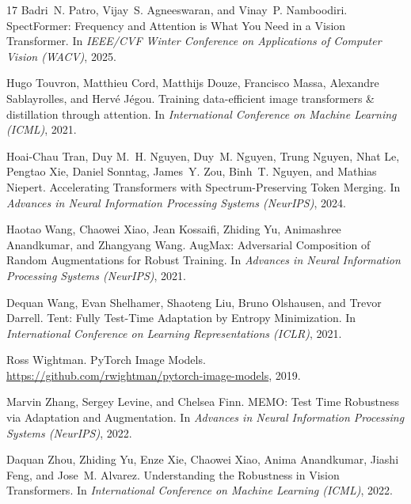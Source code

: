 \documentclass{article}
\begin{document}
\begin{thebibliography}{17}
Badri~N. Patro, Vijay~S. Agneeswaran, and Vinay~P. Namboodiri.
\newblock SpectFormer: Frequency and Attention is What You Need in a Vision Transformer.
\newblock In \emph{IEEE/CVF Winter Conference on Applications of Computer Vision (WACV)}, 2025.

Hugo Touvron, Matthieu Cord, Matthijs Douze, Francisco Massa, Alexandre Sablayrolles, and Herv\'{e} J\'{e}gou.
\newblock Training data-efficient image transformers \& distillation through attention.
\newblock In \emph{International Conference on Machine Learning (ICML)}, 2021.

Hoai-Chau Tran, Duy M.~H. Nguyen, Duy~M. Nguyen, Trung Nguyen, Nhat Le, Pengtao Xie, Daniel Sonntag, James~Y. Zou, Binh~T. Nguyen, and Mathias Niepert.
\newblock Accelerating Transformers with Spectrum-Preserving Token Merging.
\newblock In \emph{Advances in Neural Information Processing Systems (NeurIPS)}, 2024.

Haotao Wang, Chaowei Xiao, Jean Kossaifi, Zhiding Yu, Animashree Anandkumar, and Zhangyang Wang.
\newblock AugMax: Adversarial Composition of Random Augmentations for Robust Training.
\newblock In \emph{Advances in Neural Information Processing Systems (NeurIPS)}, 2021.

Dequan Wang, Evan Shelhamer, Shaoteng Liu, Bruno Olshausen, and Trevor Darrell.
\newblock Tent: Fully Test-Time Adaptation by Entropy Minimization.
\newblock In \emph{International Conference on Learning Representations (ICLR)}, 2021.

Ross Wightman.
\newblock PyTorch Image Models.
\newblock \url{https://github.com/rwightman/pytorch-image-models}, 2019.

Marvin Zhang, Sergey Levine, and Chelsea Finn.
\newblock MEMO: Test Time Robustness via Adaptation and Augmentation.
\newblock In \emph{Advances in Neural Information Processing Systems (NeurIPS)}, 2022.

Daquan Zhou, Zhiding Yu, Enze Xie, Chaowei Xiao, Anima Anandkumar, Jiashi Feng, and Jose~M. Alvarez.
\newblock Understanding the Robustness in Vision Transformers.
\newblock In \emph{International Conference on Machine Learning (ICML)}, 2022.

\end{thebibliography}
\end{document}
